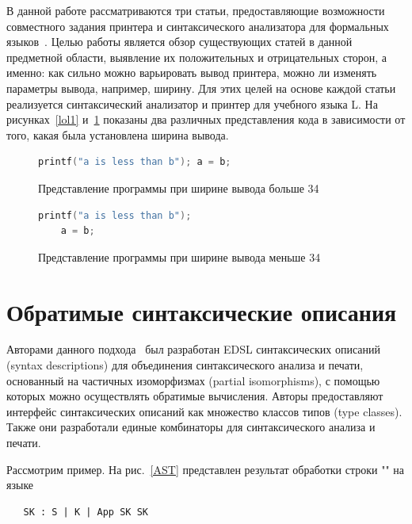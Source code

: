 В данной работе рассматриваются три статьи, предоставляющие возможности совместного задания 
принтера и синтаксического анализатора для формальных языков~\cite{Rendel,Matsuda,Boespflug}.
Целью работы является обзор существующих статей в данной предметной области, выявление их 
положительных и отрицательных сторон, а именно: как сильно можно варьировать вывод принтера, 
можно ли изменять параметры вывода, например, ширину. Для этих целей на основе каждой статьи 
реализуется синтаксический анализатор и принтер для учебного языка L. На рисунках~\ref{lol1} и~\ref{lol2} 
показаны два различных представления кода в зависимости от того, какая была установлена ширина вывода.

\begin{figure}[h]
  \centering
  \begin{minipage}[h]{0.4\textwidth}
    \begin{lstlisting}[language=C]
printf("a is less than b"); a = b;
    \end{lstlisting}
    \caption{Представление программы при ширине вывода больше 34}
    \label{lol1}
  \end{minipage}
  \hfill
  \begin{minipage}[h]{0.4\textwidth}
    \begin{lstlisting}[language = C]
printf("a is less than b"); 
    a = b;
    \end{lstlisting}
    \caption{Представление программы при ширине вывода меньше 34}
    \label{lol2}
  \end{minipage}
\end{figure}

\section{Обратимые синтаксические описания}

Авторами данного подхода~\cite{Rendel} был разработан EDSL синтаксических описаний (syntax descriptions) 
для объединения синтаксического анализа и печати, основанный на частичных изоморфизмах 
(partial isomorphisms), с помощью которых можно осуществлять обратимые вычисления. 
Авторы предоставляют интерфейс синтаксических описаний как множество классов типов (type classes). 
Также они разработали единые комбинаторы для синтаксического анализа и печати.

Рассмотрим пример. На рис.~\ref{AST} представлен результат обработки строки "" на языке 

\begin{verbatim}
   SK : S | K | App SK SK
\end{verbatim}

